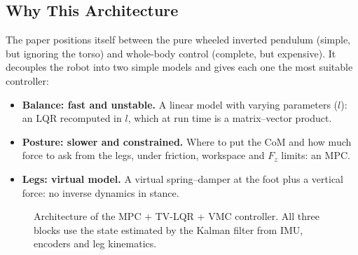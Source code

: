 \documentclass[11pt,a4paper]{article}
\begin{document}
\subsection{Why This Architecture}

The paper positions itself between the pure wheeled inverted pendulum (simple, but ignoring the
torso) and whole-body control (complete, but expensive).  It decouples the robot into two simple
models and gives each one the most suitable controller:
\begin{itemize}[leftmargin=*]
    \item \textbf{Balance: fast and unstable.}  A linear model with varying parameters ($l$):
          an LQR recomputed in $l$, which at run time is a matrix--vector product.
    \item \textbf{Posture: slower and constrained.}  Where to put the CoM and how much force to
          ask from the legs, under friction, workspace and $F_z$ limits: an MPC.
    \item \textbf{Legs: virtual model.}  A virtual spring--damper at the foot plus a vertical
          force: no inverse dynamics in stance.
\end{itemize}

\begin{figure}[H]
    \centering
    \caption{Architecture of the MPC + TV-LQR + VMC controller.  All three blocks use the state estimated by the Kalman filter from IMU, encoders and leg kinematics.}
    \label{fig:mpc_arch}
\end{figure}
\end{document}
